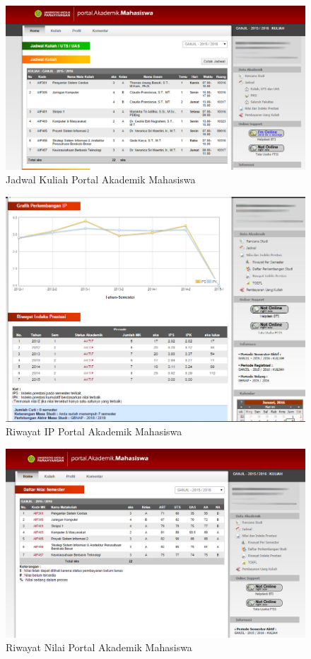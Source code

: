 		\begin{figure}[H]
			\centering
			\includegraphics[scale=0.34]{Gambar/jadwal_pam_eksperimen}
			\caption{Jadwal Kuliah Portal Akademik Mahasiswa} 
			\label{fig:5_jadwal_pam}
		\end{figure}
		
		\begin{figure}[H]
			\centering
			\includegraphics[scale=0.4]{Gambar/riwayatIP_pam_eksperimen}
			\caption{Riwayat IP Portal Akademik Mahasiswa} 
			\label{fig:5_riwayatIP_pam}
		\end{figure}
		
		\begin{figure}[H]
			\centering
			\includegraphics[scale=0.4]{Gambar/riwayatNilai_pam_eksperimen}
			\caption{Riwayat Nilai Portal Akademik Mahasiswa} 
			\label{fig:5_riwayatNilai_pam}
		\end{figure}
		
